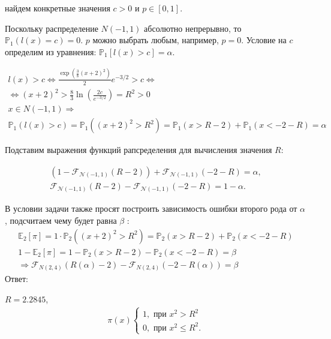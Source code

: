 \documentclass[14pt]{extarticle}
\begin{document}
найдем конкретные значения $c > 0 $ и $p \in [0,1]$.

Поскольку распределение $N(-1,1)$ абсолютно непрерывно, то \\ $\mathbb{P}_1(l(x)=c)=0$. $p$ можно выбрать любым, например, $p=0$. Условие на  $c$ определим из уравнения: $\mathbb{P}_1[l(x)>c]=\alpha$.

\begin{gather*}
        l(x)>c  \Leftrightarrow  \frac{\exp \left(\frac{3}{8}(x+2)^2\right)}{2}e^{-3 / 2}  >c \Leftrightarrow 
        \\ \Leftrightarrow
        (x+2)^2>\frac{8}{3} \ln \left(\frac{2c}{e^{-3 / 2}} \right)=R^2>0
        \\
        x \in N(-1,1) \Rightarrow 
        \\        \mathbb{P}_1(l(x)>c)=\mathbb{P}_1\left((x+2)^2>R^2\right)=\mathbb{P}_1(x>R-2)+\mathbb{P}_1(x<-2-R)=\alpha
\end{gather*}


Подставим выражения функций рапсределения для вычисления значения $R$:

\begin{gather*}
\left(1-\mathcal{F}_{\mathcal{N}(-1, 1)}(R-2)\right)+\mathcal{F}_{\mathcal{N}(-1, 1)}(-2-R)=\alpha, 
\\
\mathcal{F}_{\mathcal{N}(-1, 1)}(R-2)-\mathcal{F}_{\mathcal{N}(-1, 1)}(-2-R)=1-\alpha.
\end{gather*}

В условии задачи также просят построить зависимость ошибки второго рода от $\alpha$, подсчитаем чему будет равна $\beta$ :
\begin{gather*}
\mathbb{E}_2\left[\pi\right]=1 \cdot \mathbb{P}_2\left((x+2)^2>R^2\right)=\mathbb{P}_2(x>R-2)+\mathbb{P}_2(x<-2-R) \\
1-\mathbb{E}_2\left[\pi\right]=1-\mathbb{P}_2(x>R-2)-\mathbb{P}_2(x<-2-R)= \beta \\
\Rightarrow  \mathcal{F}_{N(2,4)}(R(\alpha)-2)-\mathcal{F}_{N(2,4)}(-2-R(\alpha))= \beta
\end{gather*}
Ответ:

\quad\quad\quad\quad\quad\quad\quad\quad$R=2.2845$,
\begin{eqnarray*}
    \pi(x)
    \begin{cases}
    1, \text{ при } x^2>R^2 \\
    0, \text{ при } x^2 \leqslant R^2.
    \end{cases}
\end{eqnarray*}
\end{document}
